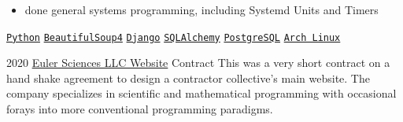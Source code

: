 \documentclass[9pt]{developercv} %
\begin{document}
\begin{entrylist}
{\begin{itemize}[leftmargin=*, noitemsep]
                \item done general systems programming, including Systemd Units and Timers
            \end{itemize}
            \texttt{{\href{https://www.python.org/}{Python}}}\slashsep
            \texttt{{\href{https://www.crummy.com/software/BeautifulSoup/bs4/doc/}{BeautifulSoup4}}}\slashsep
            \texttt{{\href{https://www.djangoproject.com/}{Django}}}\slashsep
            \texttt{{\href{https://www.sqlalchemy.org/}{SQLAlchemy}}}\slashsep
            \texttt{{\href{https://www.postgresql.org/}{PostgreSQL}}}\slashsep
            \texttt{{\href{https://archlinux.org/}{Arch Linux}}}
        }
    \entry
        {2020}
        {\href{https://euler-sci.com}{Euler Sciences LLC Website}}
        {Contract}
        {
            This was a very short contract on a hand shake agreement to design a
            contractor collective's main website. The company specializes in
            scientific and mathematical programming with occasional forays into
            more conventional programming paradigms.\\

}
\end{entrylist}
\end{document}
